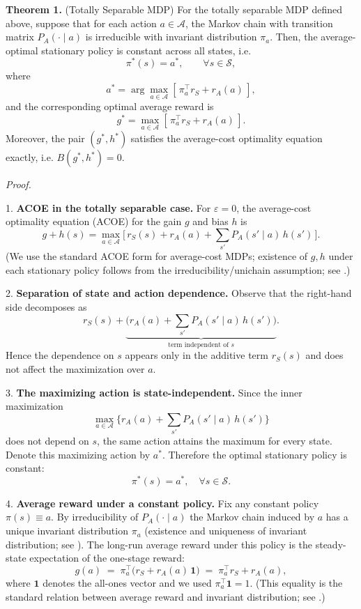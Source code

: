 \documentclass{article}
\begin{document}
\textbf{Theorem 1.} (Totally Separable MDP)  
For the totally separable MDP defined above, suppose that for each action $a \in \mathcal{A}$, the Markov chain with transition matrix $P_A(\cdot \mid a)$ is irreducible with invariant distribution $\pi_a$. Then, the average-optimal stationary policy is constant across all states, i.e.
\[
\pi^*(s) = a^*, \qquad \forall s \in \mathcal{S},
\]
where
\[
a^* = \arg\max_{a \in \mathcal{A}} \left[\, \pi_a^\top r_S + r_A(a) \,\right],
\]
and the corresponding optimal average reward is
\[
g^* = \max_{a \in \mathcal{A}} \left[\, \pi_a^\top r_S + r_A(a) \,\right].
\]
Moreover, the pair $(g^*, h^*)$ satisfies the average-cost optimality equation exactly, i.e. $B(g^*, h^*) = 0$.

\textit{Proof.}  

1. {\bf ACOE in the totally separable case.}  
For $\varepsilon = 0$, the average-cost optimality equation (ACOE) for the gain $g$ and bias $h$ is
\[
g + h(s) = \max_{a \in \mathcal{A}} \Big[\, r_S(s) + r_A(a) + \sum_{s'} P_A(s' \mid a)\, h(s') \,\Big].
\]
(We use the standard ACOE form for average-cost MDPs; existence of $g,h$ under each stationary policy follows from the irreducibility/unichain assumption; see \cite{Puterman1994,Bertsekas2012}.)

2. {\bf Separation of state and action dependence.}  
Observe that the right-hand side decomposes as
\[
r_S(s) + \underbrace{\Big( r_A(a) + \sum_{s'} P_A(s' \mid a)\, h(s') \Big)}_{\text{term independent of } s}.
\]
Hence the dependence on $s$ appears only in the additive term $r_S(s)$ and does not affect the maximization over $a$.

3. {\bf The maximizing action is state-independent.}  
Since the inner maximization
\[
\max_{a \in \mathcal{A}} \Big\{ r_A(a) + \sum_{s'} P_A(s' \mid a)\, h(s') \Big\}
\]
does not depend on $s$, the same action attains the maximum for every state. Denote this maximizing action by $a^*$. Therefore the optimal stationary policy is constant:
\[
\pi^*(s) = a^*, \quad \forall s \in \mathcal{S}.
\]

4. {\bf Average reward under a constant policy.}  
Fix any constant policy $\pi(s)\equiv a$. By irreducibility of $P_A(\cdot\mid a)$ the Markov chain induced by $a$ has a unique invariant distribution $\pi_a$ (existence and uniqueness of invariant distribution; see \cite{Puterman1994}). The long-run average reward under this policy is the steady-state expectation of the one-stage reward:
\[
g(a) \;=\; \pi_a^\top \big( r_S + r_A(a)\,\mathbf{1} \big)
\;=\; \pi_a^\top r_S + r_A(a),
\]
where $\mathbf{1}$ denotes the all-ones vector and we used $\pi_a^\top \mathbf{1} = 1$. (This equality is the standard relation between average reward and invariant distribution; see \cite{Puterman1994}.)
\end{document}

